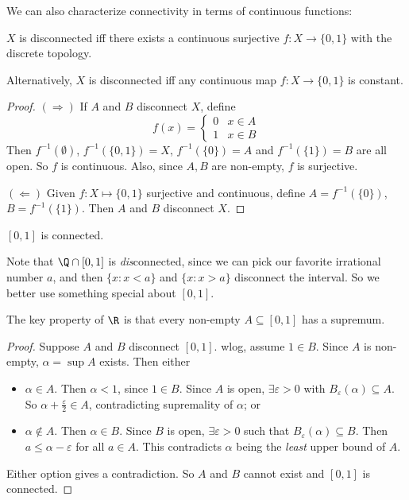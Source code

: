 \documentclass[a4paper]{article}
\begin{document}
We can also characterize connectivity in terms of continuous functions:
\begin{prop}
  $X$ is disconnected iff there exists a continuous surjective $f: X\to \{0, 1\}$ with the discrete topology.

  Alternatively, $X$ is disconnected iff any continuous map $f: X \to \{0, 1\}$ is constant.
\end{prop}

\begin{proof}
  $(\Rightarrow)$ If $A$ and $B$ disconnect $X$, define
  \[
    f(x) =
    \begin{cases}
      0 & x\in A\\
      1 & x\in B
    \end{cases}
  \]
  Then $f^{-1}(\emptyset)$, $f^{-1}(\{0, 1\}) = X$, $f^{-1}(\{0\}) = A$ and $f^{-1}(\{1\}) = B$ are all open. So $f$ is continuous. Also, since $A, B$ are non-empty, $f$ is surjective.

  $(\Leftarrow)$ Given $f: X\mapsto \{0, 1\}$ surjective and continuous, define $A = f^{-1}(\{0\})$, $B = f^{-1}(\{1\})$. Then $A$ and $B$ disconnect $X$.
\end{proof}

\begin{thm}
  $[0, 1]$ is connected.
\end{thm}

Note that $\Q\cap [0, 1]$ is \emph{dis}connected, since we can pick our favorite irrational number $a$, and then $\{x: x < a\}$ and $\{x: x > a\}$ disconnect the interval. So we better use something special about $[0, 1]$.

The key property of $\R$ is that every non-empty $A\subseteq [0, 1]$ has a supremum.
\begin{proof}
  Suppose $A$ and $B$ disconnect $[0, 1]$. wlog, assume $1\in B$. Since $A$ is non-empty, $\alpha = \sup A$ exists. Then either
  \begin{itemize}
    \item $\alpha \in A$. Then $\alpha < 1$, since $1 \in B$. Since $A$ is open, $\exists \varepsilon > 0$ with $B_\varepsilon(\alpha) \subseteq A$. So $\alpha + \frac{\varepsilon}{2} \in A$, contradicting supremality of $\alpha$; or

    \item $\alpha \not\in A$. Then $\alpha \in B$. Since $B$ is open, $\exists \varepsilon > 0$ such that $B_\varepsilon (\alpha) \subseteq B$. Then $a \leq \alpha - \varepsilon$ for all $a\in A$. This contradicts $\alpha$ being the \emph{least} upper bound of $A$.
  \end{itemize}

  Either option gives a contradiction. So $A$ and $B$ cannot exist and $[0, 1]$ is connected.
\end{proof}
\end{document}
